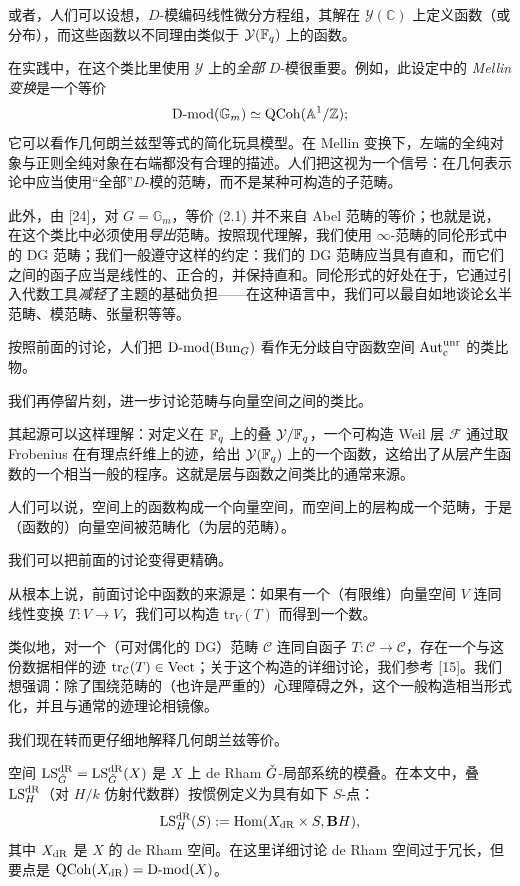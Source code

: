 或者，人们可以设想，$D$-模编码线性微分方程组，其解在 $\mathcal{Y}(\mathbb{C})$ 上定义函数（或分布），而这些函数以不同理由类似于 $\mathcal{Y}(\mathbb{F}_q)$ 上的函数。

在实践中，在这个类比里使用 $\mathcal{Y}$ 上的\emph{全部} $D$-模很重要。例如，此设定中的 \emph{Mellin 变换}是一个等价
\[
  \mathrm{D}\text{-}\mathrm{mod}(\mathbb{G}_m) \simeq \mathrm{QCoh}(\mathbb{A}^1/\mathbb{Z});
\]
它可以看作几何朗兰兹型等式的简化玩具模型。在 Mellin 变换下，左端的全纯对象与正则全纯对象在右端都没有合理的描述。人们把这视为一个信号：在几何表示论中应当使用“全部”$D$-模的范畴，而不是某种可构造的子范畴。

此外，由 [24]，对 $G = \mathbb{G}_m$，等价 (2.1) 并不来自 Abel 范畴的等价；也就是说，在这个类比中必须使用\emph{导出}范畴。按照现代理解，我们使用 $\infty$-范畴的同伦形式中的 DG 范畴；我们一般遵守这样的约定：我们的 DG 范畴应当具有直和，而它们之间的函子应当是线性的、正合的，并保持直和。同伦形式的好处在于，它通过引入代数工具\emph{减轻}了主题的基础负担——在这种语言中，我们可以最自如地谈论幺半范畴、模范畴、张量积等等。

\begin{example}
按照前面的讨论，人们把 $\mathrm{D}\text{-}\mathrm{mod}(\mathrm{Bun}_G)$ 看作无分歧自守函数空间 $\operatorname{Aut}^{\mathrm{unr}}_{\mathrm{c}}$ 的类比物。
\end{example}

\pnum{}我们再停留片刻，进一步讨论范畴与向量空间之间的类比。

其起源可以这样理解：对定义在 $\mathbb{F}_q$ 上的叠 $\mathcal{Y}/\mathbb{F}_q$，一个可构造 Weil 层 $\mathcal{F}$ 通过取 Frobenius 在有理点纤维上的迹，给出 $\mathcal{Y}(\mathbb{F}_q)$ 上的一个函数，这给出了从层产生函数的一个相当一般的程序。这就是层与函数之间类比的通常来源。

人们可以说，空间上的函数构成一个向量空间，而空间上的层构成一个范畴，于是（函数的）向量空间被范畴化（为层的范畴）。

\pnum{}我们可以把前面的讨论变得更精确。

从根本上说，前面讨论中函数的来源是：如果有一个（有限维）向量空间 $V$ 连同线性变换 $T: V \to V$，我们可以构造 $\mathrm{tr}_V(T)$ 而得到一个数。

类似地，对一个（可对偶化的 DG）范畴 $\mathcal{C}$ 连同自函子 $T: \mathcal{C} \to \mathcal{C}$，存在一个与这份数据相伴的迹 $\mathrm{tr}_{\mathcal{C}}(T) \in \mathrm{Vect}$；关于这个构造的详细讨论，我们参考 [15]。我们想强调：除了围绕范畴的（也许是严重的）心理障碍之外，这个一般构造相当形式化，并且与通常的迹理论相镜像。

\pnum{}我们现在转而更仔细地解释几何朗兰兹等价。

空间 $\mathrm{LS}^{\mathrm{dR}}_{\check{G}} = \mathrm{LS}^{\mathrm{dR}}_{\check{G}}(X)$ 是 $X$ 上 de Rham $\check{G}$-局部系统的模叠。在本文中，叠 $\mathrm{LS}^{\mathrm{dR}}_{H}$（对 $H/k$ 仿射代数群）按惯例定义为具有如下 $S$-点：
\[
  \mathrm{LS}^{\mathrm{dR}}_{H}(S) := \operatorname{Hom}(X_{\mathrm{dR}} \times S, \mathbf{B}H),
\]
其中 $X_{\mathrm{dR}}$ 是 $X$ 的 de Rham 空间。在这里详细讨论 de Rham 空间过于冗长，但要点是 $\mathrm{QCoh}(X_{\mathrm{dR}}) = \mathrm{D}\text{-}\mathrm{mod}(X)$。

